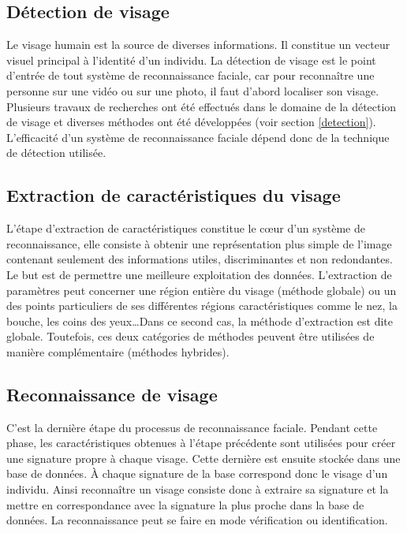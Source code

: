 \subsection{Détection de visage}
Le visage humain est la source de diverses informations. Il constitue un vecteur visuel principal à l'identité d'un individu.
La détection de visage est le point d'entrée de tout système de reconnaissance faciale, car pour reconnaître une personne sur une vidéo ou sur une photo, il faut d'abord localiser son visage. Plusieurs travaux de recherches ont été effectués dans le domaine de la détection de visage et diverses méthodes ont été développées (voir section \ref{detection}). L'efficacité d'un système de reconnaissance faciale dépend donc de la technique de détection utilisée.


\subsection{Extraction de caractéristiques du visage}
L'étape d'extraction de caractéristiques constitue le cœur d'un système de reconnaissance, elle consiste à obtenir une représentation plus simple de l'image contenant seulement des informations utiles, discriminantes et non redondantes. Le but est de permettre une meilleure exploitation des données. L'extraction de paramètres peut concerner une région entière du visage (méthode globale) ou un des points particuliers de ses différentes régions caractéristiques comme le nez, la bouche, les coins des yeux\ldots Dans ce second cas, la méthode d'extraction est dite globale. Toutefois, ces deux catégories de méthodes peuvent être utilisées de manière complémentaire (méthodes hybrides).


\subsection{Reconnaissance de visage}
C'est la dernière étape du processus de reconnaissance faciale. Pendant cette phase, les caractéristiques obtenues à l'étape précédente sont utilisées pour créer une signature propre à chaque visage. Cette dernière est ensuite stockée dans une base de données. \`{A} chaque signature de la base correspond donc le visage d'un individu. Ainsi reconnaître un visage consiste donc à extraire sa signature et la mettre en correspondance avec la signature la plus proche dans la base de données. La reconnaissance peut se faire en mode vérification ou identification.

